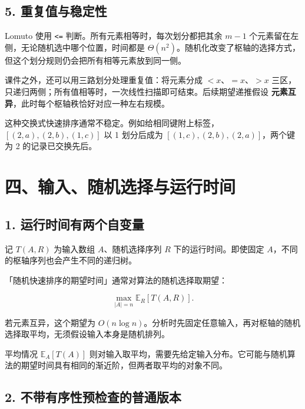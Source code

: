 \documentclass[
  UTF8,fontset=none,zihao=5]{ctexart}
\let\OldSection\section
\renewcommand{\section}{\Needspace{5\baselineskip}\OldSection}
\let\OldSubsection\subsection
\renewcommand{\subsection}{\Needspace{4\baselineskip}\OldSubsection}
\begin{document}
\hypertarget{ux91cdux590dux503cux4e0eux7a33ux5b9aux6027}{%
\subsection{5.
重复值与稳定性}\label{ux91cdux590dux503cux4e0eux7a33ux5b9aux6027}}

Lomuto 使用 \texttt{\textless{}=} 判断。所有元素相等时，每次划分都把其余
\(m-1\) 个元素留在左侧，无论随机选中哪个位置，时间都是
\(\Theta(n^2)\)。随机化改变了枢轴的选择方式，但这个划分规则仍会把所有相等元素放到同一侧。

课件之外，还可以用三路划分处理重复值：将元素分成 \(<x\)、\(=x\)、\(>x\)
三区，只递归两侧；所有值相等时，一次线性扫描即可结束。后续期望递推假设
\textbf{元素互异}，此时每个枢轴秩恰好对应一种左右规模。

这种交换式快速排序通常不稳定。例如给相同键附上标签，\([(2,a),(2,b),(1,c)]\)
以 1 划分后成为 \([(1,c),(2,b),(2,a)]\)，两个键为 2 的记录已交换先后。

\hypertarget{ux56dbux8f93ux5165ux968fux673aux9009ux62e9ux4e0eux8fd0ux884cux65f6ux95f4}{%
\section{四、输入、随机选择与运行时间}\label{ux56dbux8f93ux5165ux968fux673aux9009ux62e9ux4e0eux8fd0ux884cux65f6ux95f4}}

\hypertarget{ux8fd0ux884cux65f6ux95f4ux6709ux4e24ux4e2aux81eaux53d8ux91cf}{%
\subsection{1.
运行时间有两个自变量}\label{ux8fd0ux884cux65f6ux95f4ux6709ux4e24ux4e2aux81eaux53d8ux91cf}}

记 \(T(A,R)\) 为输入数组 \(A\)、随机选择序列 \(R\)
下的运行时间。即使固定 \(A\)，不同的枢轴序列也会产生不同的递归树。

「随机快速排序的期望时间」通常对算法的随机选择取期望：

\[
\max_{|A|=n}\mathbb E_R[T(A,R)].
\]

若元素互异，这个期望为
\(O(n\log n)\)。分析时先固定任意输入，再对枢轴的随机选择取平均，无须假设输入本身是随机排列。

平均情况 \(\mathbb E_A[T(A)]\)
则对输入取平均，需要先给定输入分布。它可能与随机算法的期望时间具有相同的渐近阶，但两者取平均的对象不同。

\hypertarget{ux4e0dux5e26ux6709ux5e8fux6027ux9884ux68c0ux67e5ux7684ux666eux901aux7248ux672c}{%
\subsection{2.
不带有序性预检查的普通版本}\label{ux4e0dux5e26ux6709ux5e8fux6027ux9884ux68c0ux67e5ux7684ux666eux901aux7248ux672c}}
\end{document}
